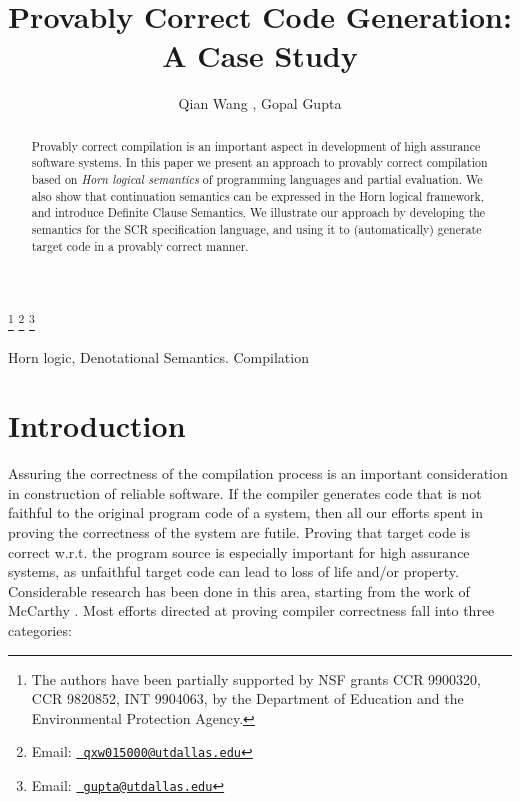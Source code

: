 \documentclass{entcs}
\begin{document}
\begin{frontmatter}
\title{Provably Correct Code Generation: A Case Study}\author{Qian
Wang
, Gopal Gupta
}
\address{Department of Computer Science\\University of Texas at Dallas\\
Richardson, TX 75083, USA}
\thanks[ALL]{The authors have been partially
supported by NSF grants  CCR 9900320, CCR 9820852, INT 9904063, by the Department of Education
and the Environmental Protection Agency.}
\thanks[qianemail]{Email:
\href{mailto:qxw015000@utdallas.edu} {\texttt{\normalshape
    qxw015000@utdallas.edu}}} \thanks[gopalemail]{Email:
\href{mailto:gupta@utdallas.edu} {\texttt{\normalshape
     gupta@utdallas.edu}}}



\begin{abstract}
Provably correct compilation is an important aspect
in development of high assurance software systems.
In this paper we present an approach to provably correct compilation
based on {\it Horn logical semantics} of programming languages and partial
evaluation. We also show that continuation semantics can be
expressed in the Horn logical framework, and
introduce Definite Clause Semantics.
We illustrate our approach by developing
the semantics for the SCR specification language, and using
it to (automatically) generate target code in a provably
correct manner.
\end{abstract}
\begin{keyword}
Horn logic, Denotational Semantics. Compilation
\end{keyword}
\end{frontmatter}

\section{Introduction}

Assuring the correctness of the compilation process
is an important consideration in construction of 
reliable software. If the compiler generates code
that is not faithful to the original program code of
a system, then all our efforts spent in proving the correctness of
the system are futile. Proving that target code 
is correct w.r.t. the program source is especially important
for high assurance systems, as unfaithful target code can 
lead to loss of life and/or property.
Considerable research has been done in this area, starting
from the work of McCarthy \cite{mccarthy}. Most efforts directed
at proving compiler correctness fall into three categories:
\end{document}
